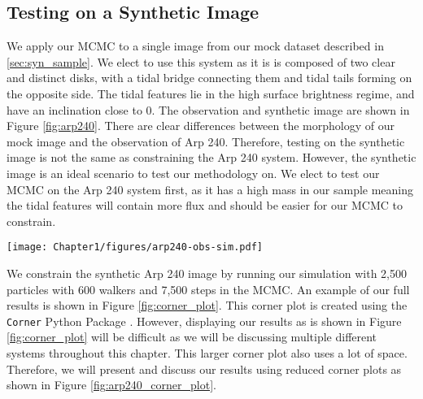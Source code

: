 \subsection{Testing on a Synthetic Image}
We apply our MCMC to a single image from our mock dataset described in \DIFdelbegin {}\DIFdelend \DIFaddbegin {}\DIFaddend \ref{sec:syn_sample}. We elect to use this system as it is is composed of two clear and distinct disks, with a tidal bridge connecting them and tidal tails forming on the opposite side. The tidal features lie in the high surface brightness regime, and have an inclination close to 0. The observation and synthetic image are shown in Figure \ref{fig:arp240}. There are clear differences between the morphology of our mock image and the observation of Arp 240. Therefore, testing on the synthetic image is not the same as constraining the Arp 240 system. However, the synthetic image is an ideal scenario to test our methodology on. We elect to test our MCMC on the Arp 240 system first, as it has a high mass in our sample meaning the tidal features will contain more flux and should be easier for our MCMC to constrain.

\begin{figure*}
\centering
\texttt{[image: Chapter1/figures/arp240-obs-sim.pdf]}
\caption[The example system used to test our MCMC: the Arp 240 interacting system.]{The example system used to test our MCMC: the Arp 240 interacting system. This system is considered an easy one to constrain. It is composed of two clearly distinct galaxies, with strong tidal features that our MCMC can match. These tidal features are the two tidal tails formed in the interaction and the tidal bridge linking the two systems. \textit{Left}: The prepared observation image of the Arp 240 system created from SDSS DR16 observations. \textit{Right}: The \DIFaddbeginFL {}\DIFaddendFL best fit \DIFdelbeginFL {}\DIFdelendFL \DIFaddbeginFL {}\DIFaddendFL found by \citet{2016MNRAS.459..720H}\DIFdelbeginFL {}\DIFdelendFL . The different in scale and orientation are discussed below.}
\label{fig:arp240}
\end{figure*}

We constrain the synthetic Arp 240 image by running our simulation with 2,500 particles with 600 walkers and 7,500 steps in the MCMC. An example of our full results is shown in Figure \ref{fig:corner_plot}. This corner plot is created using the \texttt{Corner} Python Package \citep{corner}. However, displaying our results as is shown in Figure \ref{fig:corner_plot} will be difficult as we will be discussing multiple different systems throughout this chapter. This larger corner plot also uses a lot of space. Therefore, we will present and discuss our results using reduced corner plots as shown in Figure \ref{fig:arp240_corner_plot}.

